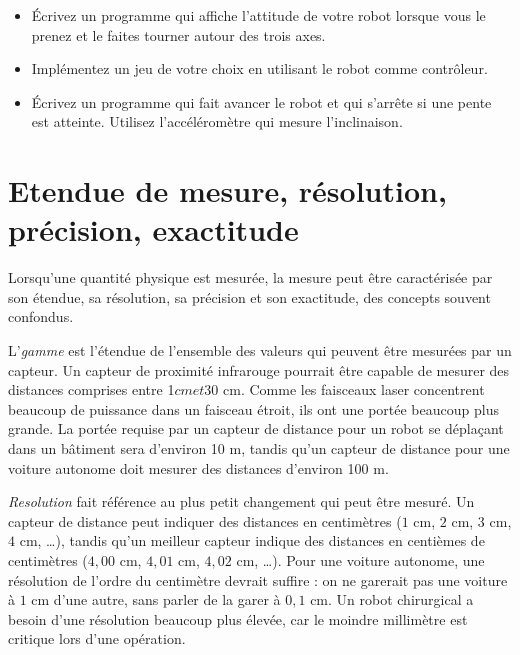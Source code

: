 \begin{framed}

\begin{itemize}
\item Écrivez un programme qui affiche l'attitude de votre robot lorsque vous le prenez et le faites tourner autour des trois axes.

\item Implémentez un jeu de votre choix en utilisant le robot comme contrôleur.

\item Écrivez un programme qui fait avancer le robot et qui s'arrête si une pente est atteinte. Utilisez l'accéléromètre qui mesure l'inclinaison.
\end{itemize}
\end{framed}

\section{Etendue de mesure, résolution, précision, exactitude}\label{s.range}

Lorsqu'une quantité physique est mesurée, la mesure peut être caractérisée par son étendue, sa résolution, sa précision et son exactitude, des concepts souvent confondus.

L'\emph{gamme} est l'étendue de l'ensemble des valeurs qui peuvent être mesurées par un capteur. Un capteur de proximité infrarouge pourrait être capable de mesurer des distances comprises entre 1$ cm et 30$ cm. Comme les faisceaux laser concentrent beaucoup de puissance dans un faisceau étroit, ils ont une portée beaucoup plus grande. La portée requise par un capteur de distance pour un robot se déplaçant dans un bâtiment sera d'environ 10 m, tandis qu'un capteur de distance pour une voiture autonome doit mesurer des distances d'environ 100 m.

\emph{Resolution} fait référence au plus petit changement qui peut être mesuré. Un capteur de distance peut indiquer des distances en centimètres ($1$ cm, $2$ cm, $3$ cm, $4$ cm, \ldots), tandis qu'un meilleur capteur indique des distances en centièmes de centimètres ($4,00$ cm, $4,01$ cm, $4,02$ cm, \ldots). Pour une voiture autonome, une résolution de l'ordre du centimètre devrait suffire : on ne garerait pas une voiture à $1$ cm d'une autre, sans parler de la garer à $0,1$ cm. Un robot chirurgical a besoin d'une résolution beaucoup plus élevée, car le moindre millimètre est critique lors d'une opération.

